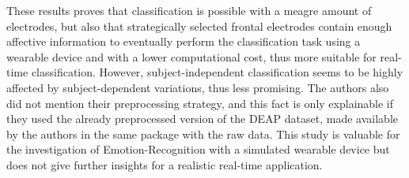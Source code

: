 These results proves that classification is possible with a meagre amount of electrodes, but also that strategically selected frontal electrodes contain enough affective information to eventually perform the classification task using a wearable device and with a lower computational cost, thus more suitable for real-time classification. However, subject-independent classification seems to be highly affected by subject-dependent variations, thus less promising. The authors also did not mention their preprocessing strategy, and this fact is only explainable if they used the already preprocessed version of the DEAP dataset, made available by the authors in the same package with the raw data. This study is valuable for the investigation of Emotion-Recognition with a simulated wearable device but does not give further insights for a realistic real-time application.
\\
\\
